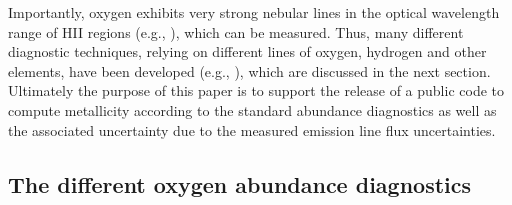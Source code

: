\documentclass{emulateapj}
\begin{document}
Importantly, oxygen exhibits very strong nebular lines in the optical wavelength range of HII regions (e.g., \citealt{pagel79,osterbrock89,tremonti04}), which can be measured. 
Thus, many different diagnostic techniques, relying on different lines of oxygen, hydrogen and other elements, have been developed (e.g., \citealt{kewley02,pettini04,kobulnicky04,kewley08}), which are discussed in the next section. Ultimately the  purpose of this paper is to support the release of a public code to compute metallicity according to the standard abundance diagnostics as well as the associated uncertainty due to the measured emission line flux uncertainties.


\subsection{The different oxygen abundance diagnostics}
\end{document}
